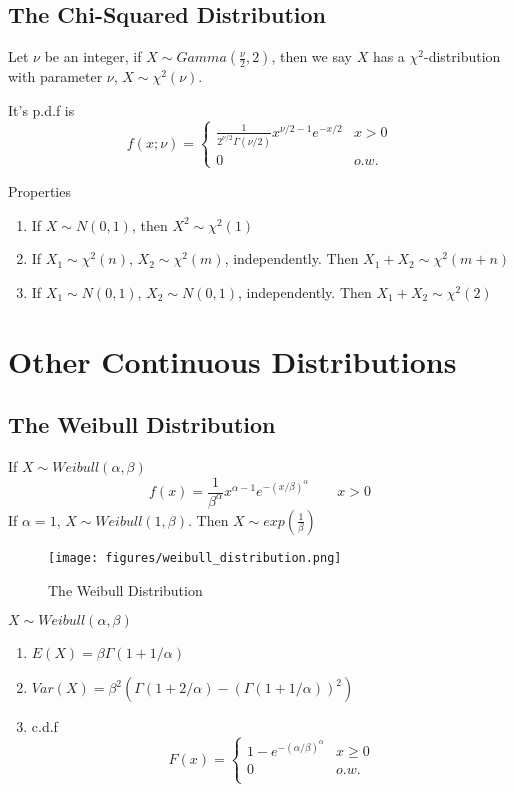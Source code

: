\subsection{The Chi-Squared Distribution}
Let $\nu$ be an integer, if $X \sim Gamma(\frac{\nu}{2},2)$, then we say $X$ has a $\chi^2$-distribution with parameter $\nu$, $X \sim \chi^2 (\nu)$.

It's p.d.f is
\[f(x;\nu)=\begin{cases}
\frac{1}{2^{\nu/2}\Gamma(\nu/2)} x^{\nu/2-1}e^{-x/2} & x>0 \\
0 & o.w.
\end{cases}\]


\begin{prop}
Properties
\begin{enumerate}
\item If $X \sim N(0,1)$, then $X^2 \sim \chi^2 (1)$
\item If $X_1 \sim \chi^2 (n)$, $X_2 \sim \chi^2 (m)$, independently. Then $X_1+X_2 \sim \chi^2 (m+n)$ 
\item If $X_1 \sim N(0,1)$, $X_2 \sim N(0,1)$, independently. Then $X_1+X_2 \sim \chi^2 (2)$ 
\end{enumerate}
\end{prop}

\section{Other Continuous Distributions}
\subsection{The Weibull Distribution}
If $X \sim Weibull(\alpha,\beta)$
\[f(x)=\frac{1}{\beta^{\alpha}}x^{\alpha-1}e^{-(x/\beta)^{\alpha}} \qquad x >0\]
If $\alpha=1$, $X \sim Weibull(1,\beta)$. Then $X \sim exp(\frac{1}{\beta}) $

\begin{figure}[H]
\centering
\texttt{[image: figures/weibull\_distribution.png]}
\caption{The Weibull Distribution}
\end{figure}

\begin{prop}
 $X \sim Weibull(\alpha,\beta)$
\begin{enumerate}
\item $E(X)=\beta \Gamma(1+1/\alpha)$
\item $Var(X)=\beta^2\left(\Gamma(1+2/\alpha)-(\Gamma(1+1/\alpha))^2\right)$
\item c.d.f
\[F(x)=\begin{cases}
1-e^{-(\alpha/\beta)^{\alpha}} & x \geq 0 \\
0	&o.w. \\
\end{cases}\]
\end{enumerate}
\end{prop}

